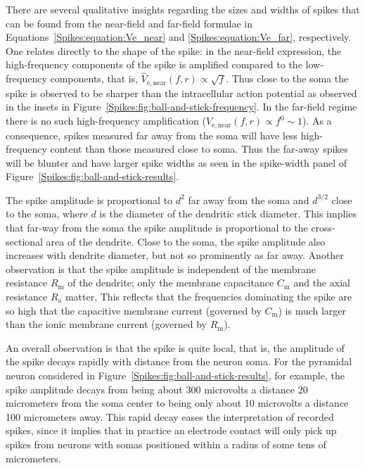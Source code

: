 There are several qualitative insights regarding the sizes and widths of spikes that can 
be found from the near-field and far-field formulae in Equations~\ref{Spikes:equation:Ve_near} and 
\ref{Spikes:equation:Ve_far}, respectively. One relates directly to the shape of the spike:
in the near-field expression, the high-frequency components of the spike is amplified 
compared to the low-frequency components, that is, $\hat{V}_\mathrm{e,near}(f,r) \propto \sqrt{f}$.
Thus close to the soma the spike is observed to be sharper than the intracellular action potential
as observed in the insets in Figure~\ref{Spikes:fig:ball-and-stick-frequency}. 
In the far-field regime there is no such high-frequency amplification ($\hat{V}_\mathrm{e,near}(f,r) \propto f^0 \sim 1$).
As a consequence, spikes measured far away from the soma will have less high-frequency content than those measured close to soma.
Thus the far-away spikes will be blunter and have larger spike widths as seen in the spike-width panel of 
Figure~\ref{Spikes:fig:ball-and-stick-results}.

The spike amplitude is proportional to $d^{2}$ far away from the soma and $d^{3/2}$ close to the soma,
where $d$ is the diameter of the dendritic stick diameter.
This implies that far-way from the soma the spike amplitude is proportional to the cross-sectional area of the dendrite.
Close to the soma, the spike amplitude also increases with dendrite diameter, but not so prominently as far away.
Another observation is that the spike amplitude is independent of the membrane resistance $R_\mathrm{m}$ of the dendrite; only the membrane 
capacitance $C_\mathrm{m}$ and the axial resistance $R_\mathrm{a}$ matter, 
This reflects that the frequencies dominating the spike are so high that the capacitive membrane current 
(governed by $C_\mathrm{m}$) is much larger than the ionic membrane current  (governed by $R_\mathrm{m}$). 

An overall observation is that the spike is quite local, that is, the amplitude of the spike decays rapidly with distance from the neuron soma. For the pyramidal neuron considered in 
Figure~\ref{Spikes:fig:ball-and-stick-results}, for example, the spike amplitude decays from being about
300 microvolts a distance 20 micrometers from the soma center to being only about 10 microvolts a
distance 100 micrometers away. This rapid decay eases the interpretation of recorded spikes, since it implies
that in practice an electrode contact will only pick up spikes from neurons with somas positioned within a radius of some tens of micrometers.


